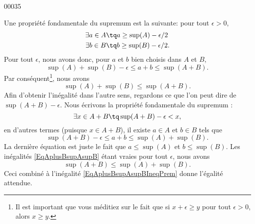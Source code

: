 
\begin{corrige}{00035}

Une propriété fondamentale du supremum est la suivante: pour tout $\epsilon>0$, 
\begin{equation}
	\begin{aligned}[]
		\exists a\in A&\tq a\geq \sup(A)-\epsilon/2\\
		\exists b\in B&\tq b\geq \sup(B)-\epsilon/2.
	\end{aligned}
\end{equation}
Pour tout $\epsilon$, nous avons donc, pour $a$ et $b$ bien choisis dans $A$ et $B$,
\begin{equation}
	\sup(A)+\sup(B)-\epsilon\leq a+b\leq\sup(A+B).
\end{equation}
Par conséquent\footnote{Il est important que vous méditiez sur le fait que si $x+\epsilon\geq y$ pour tout $\epsilon>0$, alors $x\geq y$.}, nous avons
\begin{equation}		\label{EqAplusBsupAsupBIneqPrem}	
	\sup(A)+\sup(B)\leq\sup(A+B).
\end{equation}
Afin d'obtenir l'inégalité dans l'autre sens, regardons ce que l'on peut dire de $\sup(A+B)-\epsilon$. Nous écrivons la propriété fondamentale du supremum :
\begin{equation}
	\exists x\in A+B\tq \sup(A+B)-\epsilon<x,
\end{equation}
en d'autres termes (puisque $x\in A+B$), il existe $a\in A$ et $b\in B$ tels que
\begin{equation}		\label{EqAplusBsupAsupB}
	\sup(A+B)-\epsilon\leq a+b\leq\sup(A)+\sup(B).
\end{equation}
La dernière équation est juste le fait que $a\leq\sup(A)$ et $b\leq\sup(B)$. Les inégalités \eqref{EqAplusBsupAsupB} étant vraies pour tout $\epsilon$, nous avons
\begin{equation}
	\sup(A+B)\leq\sup(A)+\sup(B).
\end{equation}
Ceci combiné à l'inégalité \eqref{EqAplusBsupAsupBIneqPrem} donne l'égalité attendue.

\end{corrige}
